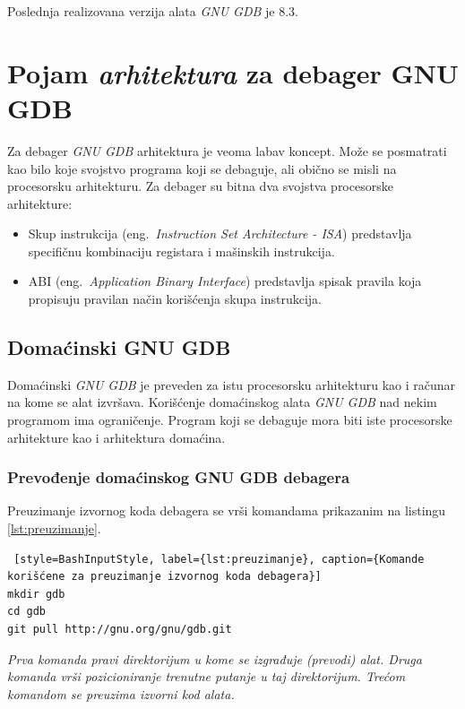 \documentclass[12pt,oneside]{memoir}
\begin{document}
Poslednja realizovana verzija alata \emph{GNU GDB} je 8.3.

\section{Pojam \emph{arhitektura} za debager GNU GDB}

Za debager \emph{GNU GDB} arhitektura je veoma labav koncept. Može se posmatrati kao bilo koje svojstvo programa koji se debaguje, ali obično se misli na procesorsku arhitekturu. Za debager su bitna dva svojstva procesorske arhitekture:

\begin{itemize}
	\item Skup instrukcija (eng.~\emph{Instruction Set Architecture - ISA}) predstavlja specifičnu kombinaciju registara i mašinskih instrukcija.
	\item ABI (eng.~\emph{Application Binary Interface}) predstavlja spisak pravila koja propisuju pravilan način korišćenja skupa instrukcija.
\end{itemize}

\subsection{Domaćinski GNU GDB}

Domaćinski \emph{GNU GDB} je preveden za istu procesorsku arhitekturu kao i računar na kome se alat izvršava. Korišćenje domaćinskog alata \emph{GNU GDB} nad nekim programom ima ograničenje. Program koji se debaguje mora biti iste procesorske arhitekture kao i arhitektura domaćina.

\subsubsection{Prevođenje domaćinskog GNU GDB debagera}

Preuzimanje izvornog koda debagera se vrši komandama prikazanim na listingu \ref{lst:preuzimanje}.
\begin{lstlisting} [style=BashInputStyle, label={lst:preuzimanje}, caption={Komande korišćene za preuzimanje izvornog koda debagera}]
mkdir gdb
cd gdb
git pull http://gnu.org/gnu/gdb.git

\end{lstlisting}

\emph{ Prva komanda pravi direktorijum u kome se izgrađuje (prevodi) alat. Druga komanda vrši pozicioniranje trenutne putanje u taj direktorijum. Trećom komandom se preuzima izvorni kod alata.}\newpage
\end{document}
